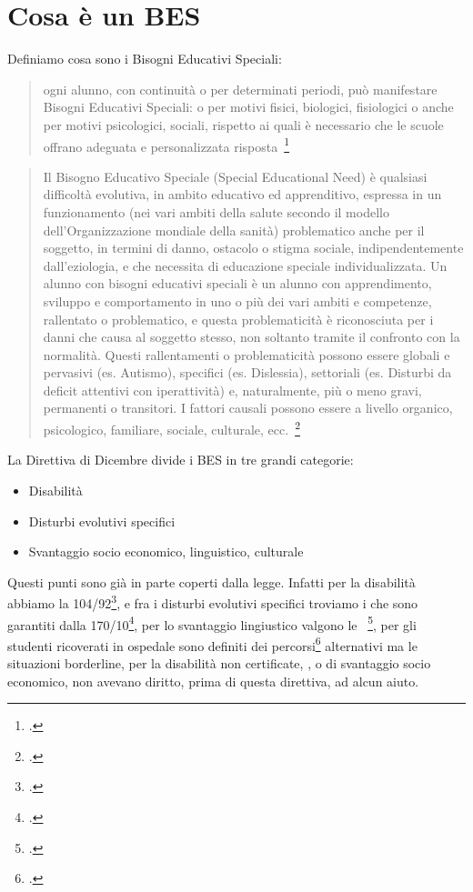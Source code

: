 \chapter{Cosa è un BES}
\label{CosaBes}
Definiamo cosa sono i Bisogni Educativi Speciali:
\begin{quote}
ogni alunno, con continuità o per determinati periodi, può manifestare Bisogni Educativi
Speciali: o per motivi fisici, biologici, fisiologici o anche per motivi psicologici, sociali, rispetto ai quali è
necessario che le scuole offrano adeguata e personalizzata risposta~\footcite{dir27Dic2012}
\end{quote}
\begin{quote}
Il Bisogno Educativo Speciale (Special Educational Need) è
qualsiasi difficoltà evolutiva, in ambito educativo ed
apprenditivo, espressa in un funzionamento (nei vari ambiti
della salute secondo il modello  dell'Organizzazione
mondiale della sanità) problematico anche per il soggetto, in
termini di danno, ostacolo o stigma sociale,
indipendentemente dall'eziologia, e che necessita di
educazione speciale individualizzata.\mancatesto
Un alunno con bisogni educativi speciali è un alunno con apprendimento, sviluppo e comportamento in uno o più dei vari ambiti e competenze, rallentato o problematico, e questa problematicità è riconosciuta per i danni che causa al soggetto stesso, non soltanto tramite il confronto con la normalità. Questi rallentamenti o problematicità possono essere globali e pervasivi (es. Autismo), specifici (es. Dislessia), settoriali (es. Disturbi da deficit attentivi con iperattività) e, naturalmente, più o meno gravi, permanenti o transitori. I fattori causali possono essere a livello organico, psicologico, familiare, sociale, culturale, ecc.~\footcite{ianes2005bisogni}
\end{quote}
La Direttiva di Dicembre divide i BES in tre grandi categorie: 
\begin{itemize}
	\item Disabilità 
	\item Disturbi evolutivi specifici
	\item Svantaggio socio
	economico, linguistico, culturale
\end{itemize}
Questi punti sono già in parte coperti dalla legge. Infatti per la disabilità abbiamo la 104/92\footcite{Legge_104_92}, e fra i disturbi evolutivi specifici troviamo i  che sono garantiti dalla 170/10\footcite{legge170}, per lo svantaggio lingiustico valgono le ~\footcite{lin_1_marzo_2006}, per gli studenti ricoverati in ospedale sono definiti dei percorsi\footcite{cm_24_11} alternativi ma le situazioni borderline, per la disabilità non certificate, , o di svantaggio socio economico, non avevano diritto, prima di questa direttiva, ad alcun aiuto. 
